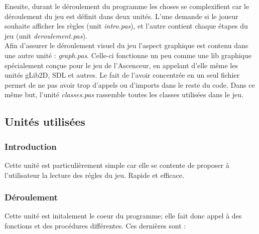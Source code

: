 \documentclass[12pt]{report}
\begin{document}
   Ensuite, durant le déroulement du programme les choses se complexifient car le déroulement du jeu est définit dans deux unités. L'une demande si le joueur souhaite afficher les règles (unit \textit{intro.pas}), et l'autre contient chaque étapes du jeu (unit \textit{deroulement.pas}). \\
   
 Afin d'assurer le déroulement visuel du jeu l'aspect graphique est contenu dans une autre unité : \textit{graph.pas}. Celle-ci fonctionne un peu comme une lib graphique spécialement conçue pour le jeu de l'Ascenceur, en appelant d'elle même les unités gLib2D, SDL et autres. Le fait de l'avoir concentrée en un seul fichier permet de ne pas avoir trop d'appels ou d'imports dans le reste du code. Dans ce même but, l'unité \textit{classes.pas} rassemble toutes les classes utilisées dans le jeu.
 \clearpage
   
   \subsection{Unités utilisées}

   	\subsubsection{Introduction}
   	Cette unité est particulièrement simple car elle se contente de proposer à l'utilisateur la lecture des régles du jeu. Rapide et efficace.
   	
 	\subsubsection{Déroulement}
  Cette unité est initalement le coeur du programme; elle fait donc appel à des fonctions et des procédures différentes. Ces dernières sont : \\
  
\end{document}
